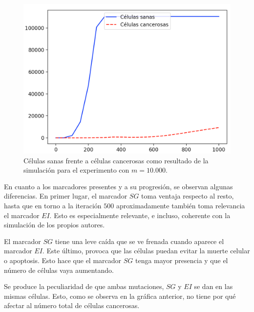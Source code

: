 \begin{figure}[h]
\centering
\includegraphics[scale=0.6]{figures/experiments/exp1/healthvscarcino}
\caption{Células sanas frente a células cancerosas como resultado de la simulación para el experimento con $m = 10.000$.}
\end{figure}

En cuanto a los marcadores presentes y a su progresión, se observan algunas diferencias. En primer lugar, el marcador
$SG$ toma ventaja respecto al resto, hasta que en torno a la iteración $500$ aproximadamente
también toma relevancia el marcador $EI$. Esto es especialmente relevante, e incluso, coherente con la simulación de los
propios autores.

El marcador $SG$ tiene una leve caída que se ve frenada cuando aparece el marcador $EI$. Este último, provoca
que las células puedan evitar la muerte celular o apoptosis. Esto hace que el marcador $SG$ tenga mayor presencia
y que el número de células vaya aumentando.

Se produce la peculiaridad de que ambas mutaciones, $SG$ y $EI$ se dan en las mismas células. Esto, como se observa
en la gráfica anterior, no tiene por qué afectar al número total de células cancerosas.

